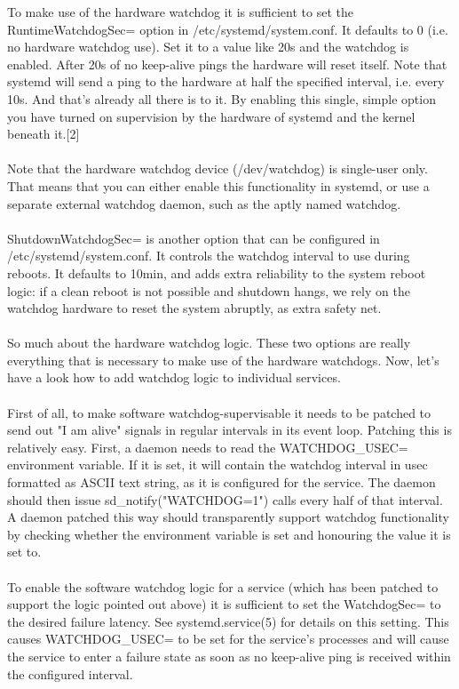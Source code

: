 \documentclass[titlepage]{article}
\begin{document}
To make use of the hardware watchdog it is sufficient to set the RuntimeWatchdogSec= option in /etc/systemd/system.conf. It defaults to 0 (i.e. no hardware watchdog use). Set it to a value like 20s and the watchdog is enabled. After 20s of no keep-alive pings the hardware will reset itself. Note that systemd will send a ping to the hardware at half the specified interval, i.e. every 10s. And that's already all there is to it. By enabling this single, simple option you have turned on supervision by the hardware of systemd and the kernel beneath it.[2]
\\
\\
Note that the hardware watchdog device (/dev/watchdog) is single-user only. That means that you can either enable this functionality in systemd, or use a separate external watchdog daemon, such as the aptly named watchdog.
\\
\\
ShutdownWatchdogSec= is another option that can be configured in /etc/systemd/system.conf. It controls the watchdog interval to use during reboots. It defaults to 10min, and adds extra reliability to the system reboot logic: if a clean reboot is not possible and shutdown hangs, we rely on the watchdog hardware to reset the system abruptly, as extra safety net.
\\
\\
So much about the hardware watchdog logic. These two options are really everything that is necessary to make use of the hardware watchdogs. Now, let's have a look how to add watchdog logic to individual services.
\\
\\
First of all, to make software watchdog-supervisable it needs to be patched to send out "I am alive" signals in regular intervals in its event loop. Patching this is relatively easy. First, a daemon needs to read the WATCHDOG\_USEC= environment variable. If it is set, it will contain the watchdog interval in usec formatted as ASCII text string, as it is configured for the service. The daemon should then issue sd\_notify("WATCHDOG=1") calls every half of that interval. A daemon patched this way should transparently support watchdog functionality by checking whether the environment variable is set and honouring the value it is set to.
\\
\\
To enable the software watchdog logic for a service (which has been patched to support the logic pointed out above) it is sufficient to set the WatchdogSec= to the desired failure latency. See systemd.service(5) for details on this setting. This causes WATCHDOG\_USEC= to be set for the service's processes and will cause the service to enter a failure state as soon as no keep-alive ping is received within the configured interval.
\end{document}
